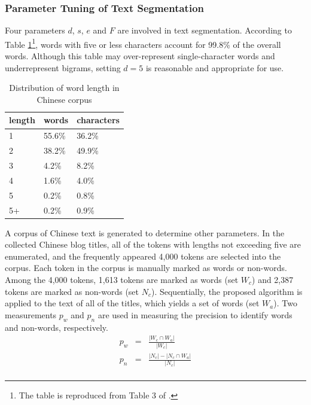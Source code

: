 \documentclass[review,3p,times,12pt,number]{elsarticle}
\begin{document}
\subsubsection{Parameter Tuning of Text Segmentation}
Four parameters $d$, $s$, $e$ and $F$ are involved in text segmentation. According to Table \ref{weibo:tab:wl}\footnote{The table is reproduced from Table 3 of \cite{teahan2000compression}.}, words with five or less characters account for 99.8\% of the overall words. Although this table may over-represent single-character words and underrepresent bigrams, setting $d=5$ is reasonable and appropriate for use.

\begin{table}[htbp]
\caption{Distribution of word length in Chinese corpus}
\label{weibo:tab:wl}
\center
\begin{tabular} {l l l}
\hline
length & words  & characters\\
\hline
1      & 55.6\% & 36.2\%\\
2      & 38.2\% & 49.9\%\\
3      & 4.2\%  & 8.2\%\\
4      & 1.6\%  & 4.0\%\\
5      & 0.2\%  & 0.8\%\\
5+     & 0.2\%  & 0.9\%\\
\hline
\end{tabular}
\end{table}

A corpus of Chinese text is generated to determine other parameters. In the collected Chinese blog titles, all of the tokens with lengths not exceeding five are enumerated, and the frequently appeared 4,000 tokens are selected into the corpus. Each token in the corpus is manually marked as words or non-words. Among the 4,000 tokens, 1,613 tokens are marked as words (set $W_c$) and 2,387 tokens are marked as non-words (set $N_c$). Sequentially,
the proposed algorithm is applied to the text of all of the titles, which yields a set of words (set $W_a$).
Two measurements $p_w$ and $p_n$ are used in measuring the precision to identify words and non-words, respectively.
\begin{eqnarray*}
p_w & = &  \frac{|W_c\cap W_a|}{|W_c|}\\
p_n & = &  \frac{|N_c|-|N_c\cap W_a|}{|N_c|}\\
\end{eqnarray*}
\end{document}
